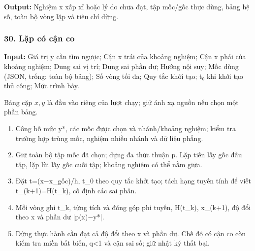 \textbf{Output:} Nghiệm x xấp xỉ hoặc lý do chưa đạt,\allowbreak{} tập mốc/\allowbreak{}gốc thực dùng,\allowbreak{} bảng hệ số,\allowbreak{} toàn bộ vòng lặp và tiêu chí dừng.

\examplebreak\subsubsection*{30. Lặp có cận co}

\textbf{Input:} Giá trị y cần tìm ngược;\allowbreak{} Cận x trái của khoảng nghiệm;\allowbreak{} Cận x phải của khoảng nghiệm;\allowbreak{} Dung sai vị trí;\allowbreak{} Dung sai phần dư;\allowbreak{} Hướng nội suy;\allowbreak{} Mốc dùng (\allowbreak{}JSON,\allowbreak{} trống: toàn bộ bảng);\allowbreak{} Số vòng tối đa;\allowbreak{} Quy tắc khởi tạo;\allowbreak{} t₀ khi khởi tạo thủ công;\allowbreak{} Mức trình bày.

Bảng cặp $x,y$ là đầu vào riêng của lượt chạy; giữ ánh xạ nguồn nếu chọn một phần bảng.

\begin{enumerate}

\item Công bố mức y*,\allowbreak{} các mốc được chọn và nhánh/\allowbreak{}khoảng nghiệm;\allowbreak{} kiểm tra trường hợp trùng mốc,\allowbreak{} nghiệm nhiều nhánh và dữ liệu phẳng.

\item Giữ toàn bộ tập mốc đã chọn;\allowbreak{} dựng đa thức thuận p. Lặp tiến lấy gốc đầu tập,\allowbreak{} lặp lùi lấy gốc cuối tập;\allowbreak{} khoảng nghiệm có thể nằm giữa.

\item Đặt t=\allowbreak{}(\allowbreak{}x\ensuremath{-}x\_gốc)/\allowbreak{}h,\allowbreak{} t\_0 theo quy tắc khởi tạo;\allowbreak{} tách hạng tuyến tính để viết t\_(\allowbreak{}k+\allowbreak{}1)=\allowbreak{}H(\allowbreak{}t\_k),\allowbreak{} cố định các sai phân.

\item Mỗi vòng ghi t\_k,\allowbreak{} từng tích và đóng góp phi tuyến,\allowbreak{} H(\allowbreak{}t\_k),\allowbreak{} x\_(\allowbreak{}k+\allowbreak{}1),\allowbreak{} độ đổi theo x và phần dư |p(\allowbreak{}x)\ensuremath{-}y*|.

\item Dừng thực hành cần đạt cả độ đổi theo x và phần dư. Chế độ có cận co còn kiểm tra miền bất biến,\allowbreak{} q<1 và cận sai số;\allowbreak{} giữ nhật ký thất bại.

\end{enumerate}

